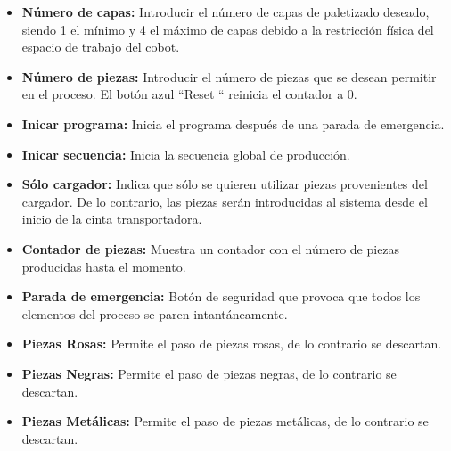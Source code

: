 \begin{itemize}
    \item \textbf{Número de capas:} Introducir el número de capas de paletizado deseado, siendo 1 el mínimo y 4 el máximo de capas debido a la restricción física del espacio de trabajo del cobot.
    
    \item \textbf{Número de piezas:} Introducir el número de piezas que se desean permitir en el proceso. El botón azul ``Reset `` reinicia el contador a 0.
    
    \item \textbf{Inicar programa:} Inicia el programa después de una parada de emergencia.
    
    \item \textbf{Inicar secuencia:} Inicia la secuencia global de producción.
    
    \item \textbf{Sólo cargador:} Indica que sólo se quieren utilizar piezas provenientes del cargador. De lo contrario, las piezas serán introducidas al sistema desde el inicio de la cinta transportadora.
    
    \item \textbf{Contador de piezas:} Muestra un contador con el número de piezas producidas hasta el momento.
    
    \item \textbf{Parada de emergencia:} Botón de seguridad que provoca que todos los elementos del proceso se paren intantáneamente.
    
    \item \textbf{Piezas Rosas:} Permite el paso de piezas rosas, de lo contrario se descartan.
    
    \item \textbf{Piezas Negras:} Permite el paso de piezas negras, de lo contrario se descartan.
    
    \item \textbf{Piezas Metálicas:} Permite el paso de piezas metálicas, de lo contrario se descartan.

\end{itemize}

